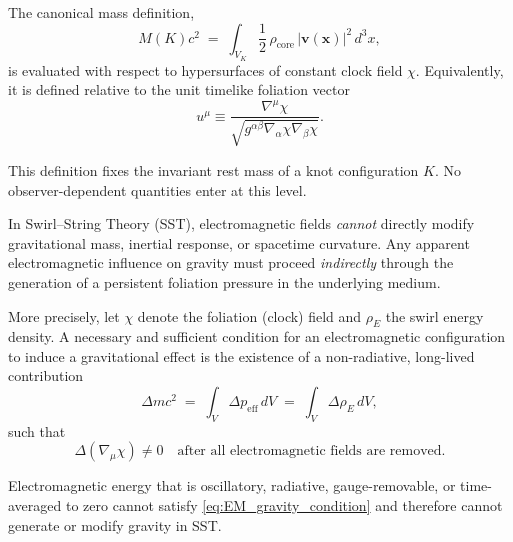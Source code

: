\documentclass[10pt]{article}
\begin{document}
        The canonical mass definition,
        \begin{equation}
            M(K)c^2
            \;=\;
            \int_{V_K} \frac{1}{2}\,\rho_{\text{core}}\,|\mathbf{v}(\mathbf{x})|^2 \, d^3x ,
        \end{equation}
        is evaluated with respect to hypersurfaces of constant clock field $\chi$.
        Equivalently, it is defined relative to the unit timelike foliation vector
        \begin{equation}
            u^\mu \equiv
            \frac{\nabla^\mu \chi}{\sqrt{g^{\alpha\beta}\nabla_\alpha \chi \nabla_\beta \chi}} .
        \end{equation}

        This definition fixes the invariant rest mass of a knot configuration $K$.
        No observer-dependent quantities enter at this level.

        \begin{theorem}
            \label{thm:EM_no_gravity}

            In Swirl--String Theory (SST), electromagnetic fields \emph{cannot} directly modify
            gravitational mass, inertial response, or spacetime curvature.
            Any apparent electromagnetic influence on gravity must proceed
            \emph{indirectly} through the generation of a persistent foliation
            pressure in the underlying medium.

            More precisely, let $\chi$ denote the foliation (clock) field and
            $\rho_{\!E}$ the swirl energy density.
            A necessary and sufficient condition for an electromagnetic configuration
            to induce a gravitational effect is the existence of a non-radiative,
            long-lived contribution
            \begin{equation}
                \Delta m c^2
                \;=\;
                \int_V \Delta p_{\mathrm{eff}} \, dV
                \;=\;
                \int_V \Delta \rho_{\!E} \, dV ,
                \label{eq:EM_gravity_condition}
            \end{equation}
            such that
            \begin{equation}
                \Delta(\nabla_\mu \chi) \neq 0
                \quad\text{after all electromagnetic fields are removed.}
                \label{eq:foliation_residual}
            \end{equation}

            Electromagnetic energy that is oscillatory, radiative, gauge-removable,
            or time-averaged to zero cannot satisfy
            \eqref{eq:EM_gravity_condition} and therefore cannot generate
            or modify gravity in SST.

        \end{theorem}
\end{document}

